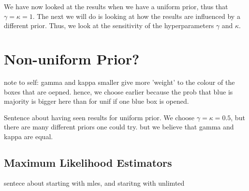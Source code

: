 We have now looked at the results when we have a uniform prior, thus that $\gamma=\kappa =1$. The next we will do is looking at how the results are influenced by a different prior. Thus, we look at the sensitivity of the hyperparameters $\gamma$ and $\kappa$.




\section{Non-uniform Prior?}
note to self: gamma and kappa smaller give more 'weight' to the colour of the boxes that are oepned. hence, we choose earlier because the prob that blue is majority is bigger here than for unif if one blue box is opened. 

Sentence about having seen results for uniform prior. We choose $\gamma=\kappa=0.5$, but there are many different priors one could try. but we believe that gamma and kappa are equal. 

\subsection{Maximum Likelihood Estimators}
sentece about starting with mles, and staritng with unlimted
